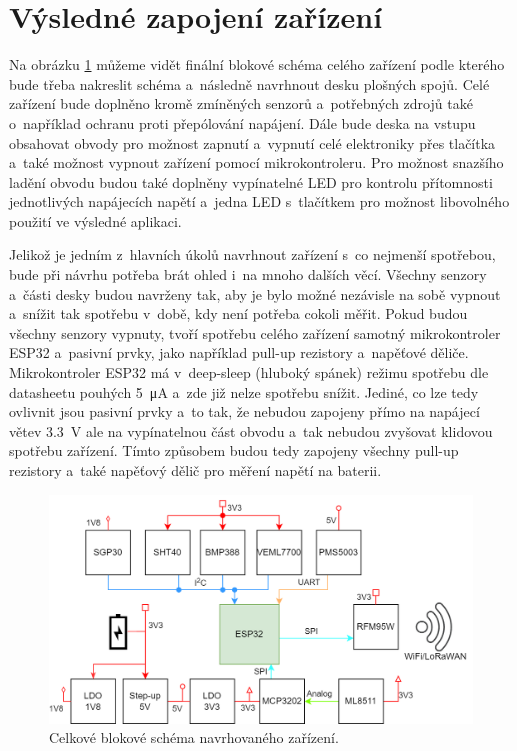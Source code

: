 \section{Výsledné zapojení zařízení}

Na obrázku \ref{fig_BlockDiagram-full} můžeme vidět finální blokové schéma celého zařízení podle kterého bude třeba nakreslit schéma a~následně navrhnout desku plošných spojů. Celé zařízení bude doplněno kromě zmíněných senzorů a~potřebných zdrojů také o~například ochranu proti přepólování napájení. Dále bude deska na vstupu obsahovat obvody pro možnost zapnutí a~vypnutí celé elektroniky přes tlačítka a~také možnost vypnout zařízení pomocí mikrokontroleru. Pro možnost snazšího ladění obvodu budou také doplněny vypínatelné LED pro kontrolu přítomnosti jednotlivých napájecích napětí a~jedna LED s~tlačítkem pro možnost libovolného použití ve výsledné aplikaci. 

Jelikož je jedním z~hlavních úkolů navrhnout zařízení s~co nejmenší spotřebou, bude při návrhu potřeba brát ohled i~na mnoho dalších věcí. Všechny senzory a~části desky budou navrženy tak, aby je bylo možné nezávisle na sobě vypnout a~snížit tak spotřebu v~době, kdy není potřeba cokoli měřit. Pokud budou všechny senzory vypnuty, tvoří spotřebu celého zařízení samotný mikrokontroler ESP32 a~pasivní prvky, jako například pull-up rezistory a~napěťové děliče. Mikrokontroler ESP32 má v~deep-sleep (hluboký spánek) režimu spotřebu dle datasheetu \cite{dat_ESP32-WROOM} pouhých \SI{5}{\micro\ampere} a~zde již nelze spotřebu snížit. Jediné, co lze tedy ovlivnit jsou pasivní prvky a~to tak, že nebudou zapojeny přímo na napájecí větev \SI{3.3}{\volt} ale na vypínatelnou část obvodu a~tak nebudou zvyšovat klidovou spotřebu zařízení. Tímto způsobem budou tedy zapojeny všechny pull-up rezistory a~také napěťový dělič pro měření napětí na baterii.

\begin{figure}[h]
    \centering
    \includegraphics[width=\textwidth]{obrazky/block_schematic.png}
    \caption{Celkové blokové schéma navrhovaného zařízení.}
    \label{fig_BlockDiagram-full}
\end{figure}

